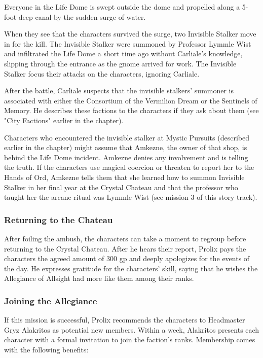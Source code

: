 \documentclass[10pt,a4paper,twoside,bg=print,twocolumn,openany,nodeprecatedcode]{dndbook}
\begin{document}
Everyone in the Life Dome is swept outside the dome and propelled along a 5-foot-deep canal by the sudden surge of water.

When they see that the characters survived the surge, two Invisible Stalker move in for the kill. The Invisible Stalker were summoned by Professor Lymmle Wist and infiltrated the Life Dome a short time ago without Carliale's knowledge, slipping through the entrance as the gnome arrived for work. The Invisible Stalker focus their attacks on the characters, ignoring Carliale.

After the battle, Carliale suspects that the invisible stalkers' summoner is associated with either the Consortium of the Vermilion Dream or the Sentinels of Memory. He describes these factions to the characters if they ask about them (see "City Factions" earlier in the chapter).

Characters who encountered the invisible stalker at Mystic Pursuits (described earlier in the chapter) might assume that Amkezne, the owner of that shop, is behind the Life Dome incident. Amkezne denies any involvement and is telling the truth. If the characters use magical coercion or threaten to report her to the Hands of Ord, Amkezne tells them that she learned how to summon Invisible Stalker in her final year at the Crystal Chateau and that the professor who taught her the arcane ritual was Lymmle Wist (see mission 3 of this story track).

\subsubsection{Returning to the Chateau}
After foiling the ambush, the characters can take a moment to regroup before returning to the Crystal Chateau. After he hears their report, Prolix pays the characters the agreed amount of 300 gp and deeply apologizes for the events of the day. He expresses gratitude for the characters' skill, saying that he wishes the Allegiance of Allsight had more like them among their ranks.

\subsubsection{Joining the Allegiance}
If this mission is successful, Prolix recommends the characters to Headmaster Gryz Alakritos as potential new members. Within a week, Alakritos presents each character with a formal invitation to join the faction's ranks. Membership comes with the following benefits:
\end{document}
